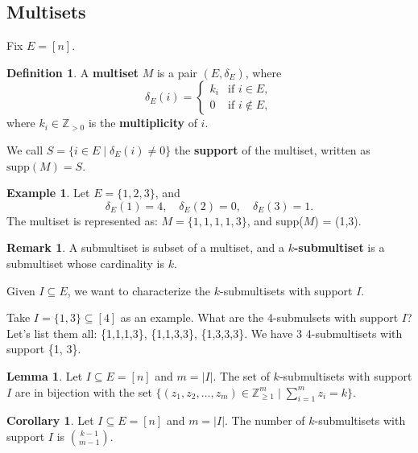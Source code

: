 \documentclass[12pt]{article}
\theoremstyle{definition}  %
\newtheorem{defi}[thm]{Definition}
\newtheorem{lemma}[thm]{Lemma}
\newtheorem{coro}[thm]{Corollary}
\newtheorem{ex}[thm]{Example}
\newtheorem{remark}[thm]{Remark}
\numberwithin{equation}{subsection}
\begin{document}
\subsection{Multisets}

Fix $E = [n]$. 

\begin{defi}
A \textbf{multiset} $M$ is a pair $(E, \delta_E)$, where
\[
\delta_E(i)=
\begin{cases}
k_i & \text{if } i \in E, \\
0 & \text{if } i \notin E,
\end{cases}
\]
where $k_i \in \mathbb{Z}_{>0}$ is the \textbf{multiplicity} of $i$.

We call $S = \{ i\in E \mid \delta_E(i) \ne 0\}$ the \textbf{support} of the multiset, written as $\text{supp}(M) = S$.
\end{defi}

\begin{ex}
Let $E = \{1, 2, 3\}$, and
\[
\delta_E(1) = 4, \quad \delta_E(2) = 0, \quad \delta_E(3) = 1.
\]
The multiset is represented as:
$M = \{1, 1, 1, 1, 3\}$, and supp($M$) = (1,3).

\end{ex}

\begin{remark}
    A submultiset is subset of a multiset, and a \textbf{$k$-submultiset} is a submultiset whose cardinality is $k$. 
\end{remark}

Given $I \subseteq E$, we want to characterize the $k$-submultisets with support $I$. 

Take $I= \{1,3\} \subseteq [4]$ as an example. What are the 4-submulsets with support $I$? Let's list them all: \{1,1,1,3\}, \{1,1,3,3\}, \{1,3,3,3\}. We have 3 4-submultisets with support \{1, 3\}.

\begin{lemma}
    Let $I \subseteq E = [n]$ and $m = | I |$. The set of $k$-submultisets with support $I$ are in bijection with the set $\{(z_1, z_2, \ldots, z_m) \in \mathbb{Z}_{\geq 1}^{m} \mid \sum_{i = 1}^{m} z_i = k\}$.
\end{lemma}
\begin{coro}
    Let $I \subseteq E = [n]$ and $m = | I |$. The number of $k$-submultisets with support $I$ is $\binom{k-1}{m-1}$.
\end{coro}
\end{document}
